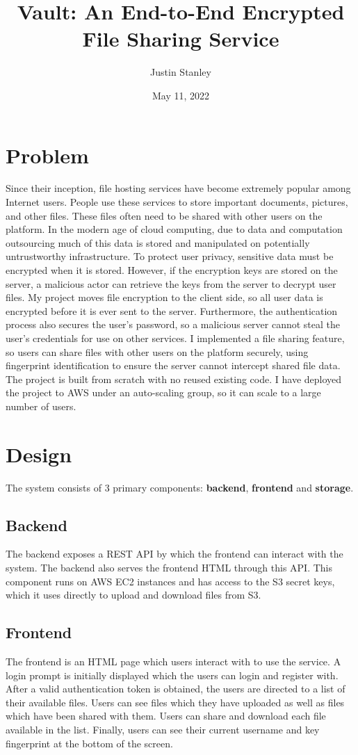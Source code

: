\documentclass{article}
\title{Vault: An End-to-End Encrypted File Sharing Service}
\author{Justin Stanley}
\date{May 11, 2022}
\begin{document}
\maketitle

\section{Problem}
Since their inception, file hosting services have become extremely popular among Internet users. People use these services to store important documents, pictures, and other files. These files often need to be shared with other users on the platform. In the modern age of cloud computing, due to data and computation outsourcing much of this data is stored and manipulated on potentially untrustworthy infrastructure. To protect user privacy, sensitive data must be encrypted when it is stored. However, if the encryption keys are stored on the server, a malicious actor can retrieve the keys from the server to decrypt user files. My project moves file encryption to the client side, so all user data is encrypted before it is ever sent to the server. Furthermore, the authentication process also secures the user's password, so a malicious server cannot steal the user's credentials for use on other services. I implemented a file sharing feature, so users can share files with other users on the platform securely, using fingerprint identification to ensure the server cannot intercept shared file data. The project is built from scratch with no reused existing code. I have deployed the project to AWS under an auto-scaling group, so it can scale to a large number of users.

\section{Design}
The system consists of 3 primary components: \textbf{backend}, \textbf{frontend} and \textbf{storage}.
\subsection{Backend}
The backend exposes a REST API by which the frontend can interact with the system. The backend also serves the frontend HTML through this API. This component runs on AWS EC2 instances and has access to the S3 secret keys, which it uses directly to upload and download files from S3.
\subsection{Frontend}
The frontend is an HTML page which users interact with to use the service. A login prompt is initially displayed which the users can login and register with. After a valid authentication token is obtained, the users are directed to a list of their available files. Users can see files which they have uploaded as well as files which have been shared with them. Users can share and download each file available in the list. Finally, users can see their current username and key fingerprint at the bottom of the screen.
\end{document}
